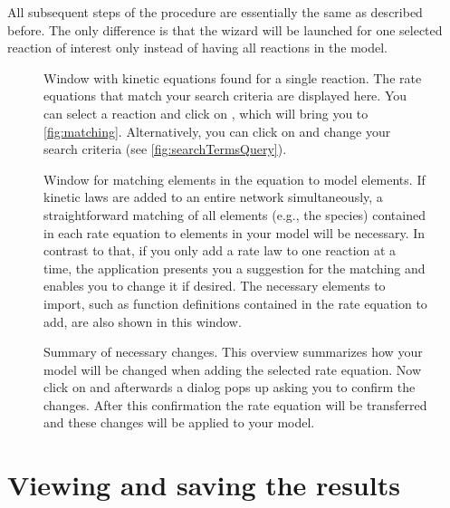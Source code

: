 All subsequent steps of the procedure are essentially the same as described before.
The only difference is that the \SABIO wizard will be launched for one selected reaction of interest only instead of having all reactions in the model.
\begin{figure}[t!]
\caption[Window with kinetic equations found for a single reaction]{Window with kinetic equations found for a single reaction.
The rate equations that match your search criteria are displayed here.
You can select a reaction and click on , which will bring you to \vref{fig:matching}.
Alternatively, you can click on  and change your search criteria (see \vref{fig:searchTermsQuery}).
\label{fig:foundEquationsManual}}
\end{figure}
\begin{figure}
\caption[Window for matching elements in the equation to model elements]{Window for matching elements in the equation to model elements.
If kinetic laws are added to an entire network simultaneously, a straightforward matching of all elements (e.g., the species) contained in each rate equation to \SBML elements in your model will be necessary. 
In contrast to that, if you only add a rate law to one reaction at a time, the application presents you a suggestion for the matching and enables you to change it if desired. 
The necessary elements to import, such as function definitions contained in the rate equation to add, are also shown in this window.}
\label{fig:matching}
\end{figure}
\begin{figure}
\caption[Summary of necessary changes]{Summary of necessary changes.
This overview summarizes how your model will be changed when adding the selected rate equation.
Now click on  and afterwards a dialog pops up asking you to confirm the changes.
After this confirmation the rate equation will be transferred and these changes will be applied to your model.}
\label{fig:changesManual}
\end{figure}


\section{Viewing and saving the results}

